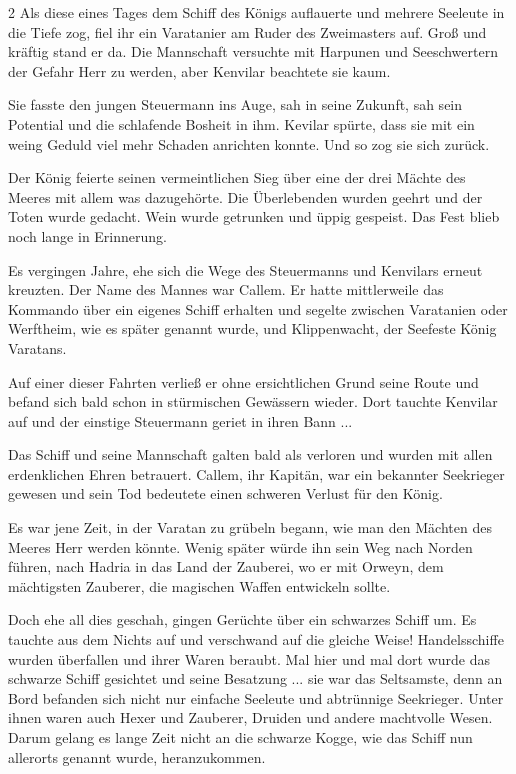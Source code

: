 \documentclass[10pt, a4paper, oneside]{book}
\begin{document}
\begin{multicols}{2}
Als diese eines Tages dem Schiff des Königs auflauerte und mehrere Seeleute in die Tiefe zog, fiel ihr ein Varatanier am Ruder des Zweimasters auf. Groß und kräftig stand er da. Die Mannschaft versuchte mit Harpunen und Seeschwertern der Gefahr Herr zu werden, aber Kenvilar beachtete sie kaum.

Sie fasste den jungen Steuermann ins Auge, sah in seine Zukunft, sah sein Potential und die schlafende Bosheit in ihm. Kevilar spürte, dass sie mit ein weing Geduld viel mehr Schaden anrichten konnte. Und so zog sie sich zurück.\bigskip

Der König feierte seinen vermeintlichen Sieg über eine der drei Mächte des Meeres mit allem was dazugehörte. Die Überlebenden wurden geehrt und der Toten wurde gedacht. Wein wurde getrunken und üppig gespeist. Das Fest blieb noch lange in Erinnerung.

Es vergingen Jahre, ehe sich die Wege des Steuermanns und Kenvilars erneut kreuzten.  Der Name des Mannes war Callem. Er hatte mittlerweile das Kommando über ein eigenes Schiff erhalten und segelte zwischen Varatanien oder Werftheim, wie es später genannt wurde, und Klippenwacht, der Seefeste König Varatans.\bigskip

Auf einer dieser Fahrten verließ er ohne ersichtlichen Grund seine Route und befand sich bald schon in stürmischen Gewässern wieder. Dort tauchte Kenvilar auf und der einstige Steuermann geriet in ihren Bann ...\bigskip

Das Schiff und seine Mannschaft galten bald als verloren und wurden mit allen erdenklichen Ehren betrauert. Callem, ihr Kapitän, war ein bekannter Seekrieger gewesen und sein Tod bedeutete einen schweren Verlust für den König.\bigskip

Es war jene Zeit, in der Varatan zu grübeln begann, wie man den Mächten des Meeres Herr werden könnte. Wenig später würde ihn sein Weg nach Norden führen, nach Hadria in das Land der Zauberei, wo er mit Orweyn, dem mächtigsten Zauberer, die magischen Waffen entwickeln sollte.\bigskip

Doch ehe all dies geschah, gingen Gerüchte über ein schwarzes Schiff um. Es tauchte aus dem Nichts auf und verschwand auf die gleiche Weise! Handelsschiffe wurden überfallen und ihrer Waren beraubt. Mal hier und mal dort wurde das schwarze Schiff gesichtet und seine Besatzung ...  sie war das Seltsamste, denn an Bord befanden sich nicht nur einfache Seeleute und abtrünnige Seekrieger. Unter ihnen waren auch Hexer und Zauberer, Druiden und andere machtvolle Wesen. Darum gelang es lange Zeit nicht an die schwarze Kogge, wie das Schiff nun allerorts genannt wurde, heranzukommen.


\end{multicols}
\end{document}
